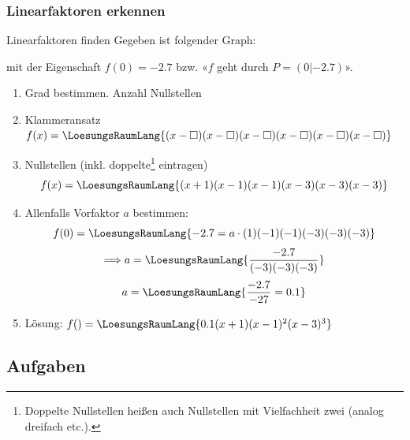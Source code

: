 
\newpage


\subsubsection{Linearfaktoren erkennen}

\begin{rezept}{Linearfaktoren finden}{}
Gegeben ist folgender Graph:

  mit der Eigenschaft $f(0) = -2.7$ bzw. «$f$ geht durch $P=(0|-2.7)$».
    
    \begin{enumerate}
  \item Grad bestimmen. Anzahl Nullstellen
     
  \item Klammeransatz $f(x) =
    \LoesungsRaumLang{(x-\Box)(x-\Box)(x-\Box)(x-\Box)(x-\Box)(x-\Box)}$
  \item Nullstellen (inkl. doppelte\footnote{Doppelte Nullstellen heißen auch
      Nullstellen mit Vielfachheit zwei (analog
      dreifach etc.).} eintragen)
    $$f(x) = \LoesungsRaumLang{(x+1)(x-1)(x-1)(x-3)(x-3)(x-3)}$$
  \item Allenfalls Vorfaktor $a$ bestimmen:
    $$f(0) = \LoesungsRaumLang{-2.7 = a \cdot{}(1)(-1)(-1)(-3)(-3)(-3)}$$
    $$\Longrightarrow a= \LoesungsRaumLang{\frac{-2.7}{(-3)(-3)(-3)}}$$
    $$a  = \LoesungsRaumLang{\frac{-2.7}{-27} = 0.1}$$

  \item Lösung: $f() = \LoesungsRaumLang{0.1 (x+1)(x-1)^2(x-3)^3}$ 
    \end{enumerate}
  
  \end{rezept}
\newpage


\subsection*{Aufgaben}

